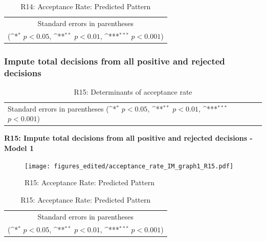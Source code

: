 \documentclass[10pt,a4paper]{scrartcl}
\begin{document}
\begin{table}[!ht]\centering
	\footnotesize
	\renewcommand{\arraystretch}{1.2}
	\def\sym#1{\ifmmode^{#1}\else\(^{#1}\)\fi}
	\caption{R14: Acceptance Rate: Predicted Pattern}
	\begin{tabular}{l*{2}{c}}
		\hline\hline
		
		\hline\hline
		\multicolumn{3}{c}{\footnotesize Standard errors in parentheses} \\
		\multicolumn{3}{c}{\footnotesize (\sym{*} \(p<0.05\), \sym{**} \(p<0.01\), \sym{***} \(p<0.001\))} \\
	\end{tabular}
\end{table}





\clearpage
\FloatBarrier
\subsubsection{Impute total decisions from all positive and rejected decisions}
\begin{table}[!ht]\centering
	\renewcommand{\arraystretch}{1.25}
	\small
	\def\sym#1{\ifmmode^{#1}\else\(^{#1}\)\fi}
	\caption{R15: Determinants of acceptance rate}
	\begin{tabular}{l*{3}{c}}
		\hline\hline
		
		\hline\hline
		\multicolumn{4}{l}{\footnotesize Standard errors in parentheses (\sym{*} \(p<0.05\), \sym{**} \(p<0.01\), \sym{***} \(p<0.001\))}\\
	\end{tabular}
\end{table}

\clearpage
\textbf{R15: Impute total decisions from all positive and rejected decisions - Model 1}
\begin{figure}[!ht]
	\centering
	\texttt{[image: figures\_edited/acceptance\_rate\_IM\_graph1\_R15.pdf]}
	\caption{R15: Acceptance Rate: Predicted Pattern}
\end{figure}

\begin{table}[!ht]\centering
	\renewcommand{\arraystretch}{1.25}
	\def\sym#1{\ifmmode^{#1}\else\(^{#1}\)\fi}
	\caption{R15: Acceptance Rate: Predicted Pattern}
	\begin{tabular}{l*{2}{c}}
		\hline\hline
		
		\hline\hline
		\multicolumn{3}{c}{\footnotesize Standard errors in parentheses} \\
		\multicolumn{3}{c}{\footnotesize (\sym{*} \(p<0.05\), \sym{**} \(p<0.01\), \sym{***} \(p<0.001\))}\\
	\end{tabular}
\end{table}
\end{document}

